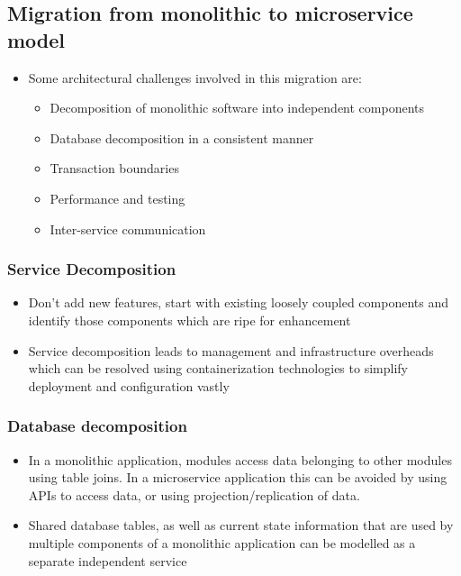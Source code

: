 \documentclass{article}
\begin{document}
\subsection{Migration from monolithic to microservice model}
\begin{itemize}
    \item Some architectural challenges involved in this migration are:
    \begin{itemize}
        \item Decomposition of monolithic software into independent components
        
        \item Database decomposition in a consistent manner
        
        \item Transaction boundaries
        
        \item Performance and testing
        
        \item Inter-service communication
    \end{itemize}
\end{itemize}
\subsubsection{Service Decomposition}
\begin{itemize}
    \item Don't add new features, start with existing loosely coupled components and identify those components which are ripe for enhancement
    
    \item Service decomposition leads to management and infrastructure overheads which can be resolved using containerization technologies to simplify deployment and configuration vastly
\end{itemize}

\subsubsection{Database decomposition}
\begin{itemize}
    \item In a monolithic application, modules access data belonging to other modules using table joins. In a microservice application this can be avoided by using APIs to access data, or using projection/replication of data.
    
    \item Shared database tables, as well as current state information that are used by multiple components of a monolithic application can be modelled as a separate independent service
\end{itemize}
\end{document}
